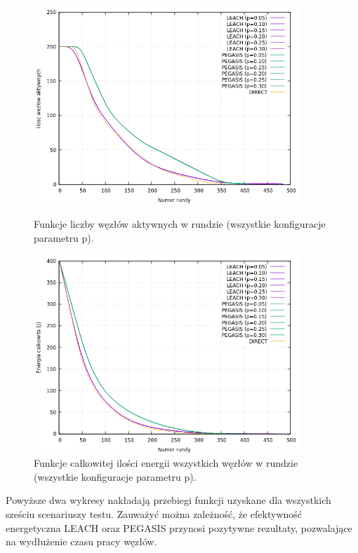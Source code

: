 \documentclass[a4paper,12pt,twoside,openany]{report}
\begin{document}
\begin{figure}[H]
 \centering
 \includegraphics[width=10cm]{images/gnuplot/test_4/nodes_in_round_all.png}
 \caption{Funkcje liczby węzłów aktywnych w rundzie (wszystkie konfiguracje parametru p).}
 \includegraphics[width=10cm]{images/gnuplot/test_4/energy_in_round_all.png}
 \caption{Funkcje całkowitej ilości energii wszystkich węzłów w rundzie (wszystkie konfiguracje parametru p).}
\end{figure}

\par
Powyższe dwa wykresy nakładają przebiegi funkcji uzyskane dla wszystkich sześciu scenariuszy testu.
Zauważyć można zależność, że efektywność energetyczna LEACH oraz PEGASIS przynosi pozytywne rezultaty, pozwalające na wydłużenie czasu pracy węzłów.
\end{document}
